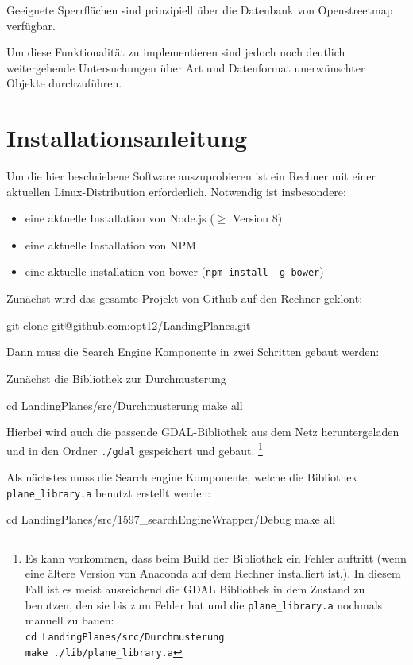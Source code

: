 \documentclass[10pt,a4paper]{report}
\newcommand*{\skippingparagraph}{\par\vspace{1.0\baselineskip}\noindent}
\begin{document}
Geeignete Sperrflächen sind prinzipiell über die Datenbank von Openstreetmap verfügbar. 

Um diese Funktionalität zu implementieren sind jedoch noch deutlich weitergehende Untersuchungen über Art und Datenformat unerwünschter Objekte durchzuführen.

\appendix
\chapter{Installationsanleitung}

Um die hier beschriebene Software auszuprobieren ist ein Rechner mit einer aktuellen Linux-Distribution erforderlich.
Notwendig ist insbesondere:
\begin{itemize}
\item eine aktuelle Installation von Node.js ($\geq$ Version 8)
\item eine aktuelle Installation von NPM
\item eine aktuelle installation von bower (\texttt{npm install -g bower})
\end{itemize}

Zunächst wird das gesamte Projekt von Github auf den Rechner geklont:
\begin{verbatim*}
git clone git@github.com:opt12/LandingPlanes.git
\end{verbatim*}

\skippingparagraph
Dann muss die Search Engine Komponente in zwei Schritten gebaut werden:

Zunächst die Bibliothek zur Durchmusterung
\begin{verbatim*}
cd LandingPlanes/src/Durchmusterung
make all
\end{verbatim*}

Hierbei wird auch die passende GDAL-Bibliothek aus dem Netz heruntergeladen und in den Ordner \texttt{./gdal} gespeichert und gebaut. \footnote{Es kann vorkommen, dass beim Build der Bibliothek ein Fehler auftritt (wenn eine ältere Version von Anaconda auf dem Rechner installiert ist.). In diesem Fall ist es meist ausreichend die GDAL Bibliothek in dem Zustand zu benutzen, den sie bis zum Fehler hat und die \texttt{plane\_library.a} nochmals manuell zu bauen:\\
\texttt{cd LandingPlanes/src/Durchmusterung}\\
\texttt{make ./lib/plane\_library.a}
}

Als nächstes muss die Search engine Komponente, welche die Bibliothek \texttt{plane\_library.a} benutzt erstellt werden:
\begin{verbatim*}
cd LandingPlanes/src/1597_searchEngineWrapper/Debug
make all
\end{verbatim*}
\end{document}

